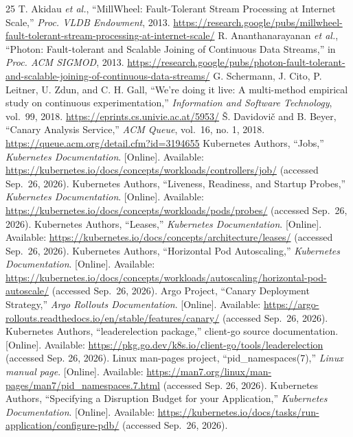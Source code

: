 \begin{thebibliography}{25}
 T. Akidau \emph{et al.}, ``MillWheel: Fault-Tolerant Stream Processing
at Internet Scale,'' \emph{Proc. VLDB Endowment}, 2013.
\url{https://research.google/pubs/millwheel-fault-tolerant-stream-processing-at-internet-scale/}
 R. Ananthanarayanan \emph{et al.}, ``Photon: Fault-tolerant and Scalable
Joining of Continuous Data Streams,'' in \emph{Proc. ACM SIGMOD}, 2013.
\url{https://research.google/pubs/photon-fault-tolerant-and-scalable-joining-of-continuous-data-streams/}
 G. Schermann, J. Cito, P. Leitner, U. Zdun, and C. H. Gall, ``We're
doing it live: A multi-method empirical study on continuous
experimentation,'' \emph{Information and Software Technology}, vol.~99,
2018. \url{https://eprints.cs.univie.ac.at/5953/}
 Š. Davidovič and B. Beyer, ``Canary Analysis Service,'' \emph{ACM
Queue}, vol.~16, no. 1, 2018.
\url{https://queue.acm.org/detail.cfm?id=3194655}
 Kubernetes Authors, ``Jobs,'' \emph{Kubernetes Documentation}.
{[}Online{]}. Available:
\url{https://kubernetes.io/docs/concepts/workloads/controllers/job/} (accessed
Sep.~26, 2026).
 Kubernetes Authors, ``Liveness, Readiness, and Startup Probes,''
\emph{Kubernetes Documentation}. {[}Online{]}. Available:
\url{https://kubernetes.io/docs/concepts/workloads/pods/probes/} (accessed
Sep.~26, 2026).
 Kubernetes Authors, ``Leases,'' \emph{Kubernetes Documentation}.
{[}Online{]}. Available:
\url{https://kubernetes.io/docs/concepts/architecture/leases/} (accessed
Sep.~26, 2026).
 Kubernetes Authors, ``Horizontal Pod Autoscaling,'' \emph{Kubernetes
Documentation}. {[}Online{]}. Available:
\url{https://kubernetes.io/docs/concepts/workloads/autoscaling/horizontal-pod-autoscale/}
(accessed Sep.~26, 2026).
 Argo Project, ``Canary Deployment Strategy,'' \emph{Argo Rollouts
Documentation}. {[}Online{]}. Available:
\url{https://argo-rollouts.readthedocs.io/en/stable/features/canary/}
(accessed Sep.~26, 2026).
 Kubernetes Authors, ``leaderelection package,'' client-go source documentation. [Online]. Available: \url{https://pkg.go.dev/k8s.io/client-go/tools/leaderelection} (accessed Sep. 26, 2026).
 Linux man-pages project, ``pid\_namespaces(7),'' \emph{Linux manual page}. [Online]. Available: \url{https://man7.org/linux/man-pages/man7/pid_namespaces.7.html} (accessed Sep. 26, 2026).
 Kubernetes Authors, ``Specifying a Disruption Budget for your
Application,'' \emph{Kubernetes Documentation}. {[}Online{]}. Available:
\url{https://kubernetes.io/docs/tasks/run-application/configure-pdb/}
(accessed Sep.~26, 2026).
\end{thebibliography}